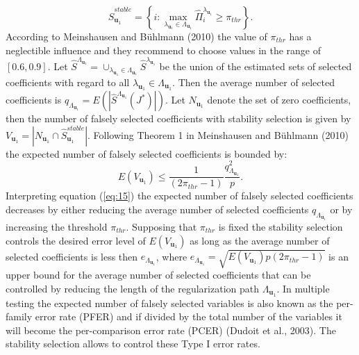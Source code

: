 \documentclass{bioinfo}
\begin{document}
\begin{methods}
\begin{equation} 
 \hat{S}_{\mathbf{u}_{1}}^{stable}=\left\{i: \max_{\lambda_{\mathbf{u}_{1}} \in \Lambda_{\mathbf{u}_{1}}}\hat{\Pi}_{i}^{\lambda_{\mathbf{u}_{1}}} \geq \pi_{thr} \right\}.
\end{equation}
According to Meinshausen and B\"uhlmann (2010) the value of $\pi_{thr}$ has a neglectible influence and they recommend to choose values in the range of $[0.6,0.9]$. Let $\hat{S}^{\Lambda_{\mathbf{u}_{1}}}= \cup_{\lambda_{\mathbf{u}_{1}} \in \Lambda_{\mathbf{u}_{1}}} \hat{S}^{\lambda_{\mathbf{u}_{1}}}$ be
the union of the estimated sets of selected coefficients with regard to all $\lambda_{\mathbf{u}_{1}} \in \Lambda_{\mathbf{u}_{1}}$.
Then the average number of selected coefficients is $q_{\Lambda_{\mathbf{u}_{1}}}=E(|\hat{S}^{\Lambda_{\mathbf{u}_{1}}}(J^{*})|)$. 
Let $N_{\mathbf{u}_{1}}$ denote the set of zero coefficients, then the number of falsely selected coefficients with stability selection is given by $V_{\mathbf{u}_{1}}=|N_{\mathbf{u}_{1}}\cap\hat{S}_{\mathbf{u}_{1}}^{stable}|$. 
Following Theorem 1 in Meinshausen and B\"uhlmann (2010) the expected number of falsely selected coefficients is bounded by:
\begin{equation}
E(V_{\mathbf{u}_{1}}) \leq \frac{1}{(2\pi_{thr}-1)} \frac{q^{2}_{\Lambda_{\mathbf{u}_{1}}}}{p}.
\label{eq:15}
\end{equation}
Interpreting equation (\ref{eq:15}) the expected number of falsely selected coefficients decreases by either reducing the average number of selected coefficients $q_{\Lambda_{\mathbf{u}_{1}}}$ or by increasing the threshold $\pi_{thr}$. Supposing that $\pi_{thr}$ is fixed the stability selection controls the desired error level of $E(V_{\mathbf{u}_{1}})$ as long as the average number of selected coefficients is less then $e_{\Lambda_{\mathbf{u}_{1}}}$, where $e_{\Lambda_{\mathbf{u}_{1}}} = \sqrt{E(V_{\mathbf{u}_{1}})p(2\pi_{thr}-1)}$ is an upper bound for the average number of selected coefficients that can be controlled by reducing the length of the regularization path $\Lambda_{\mathbf{u}_{1}}$. In multiple testing the expected number of falsely selected variables is also known as the per-family error rate (PFER) and if divided by the total number of the variables it will become the per-comparison error rate (PCER) (Dudoit et al., 2003). The stability selection allows to control these Type I error rates. 


\end{methods}
\end{document}
